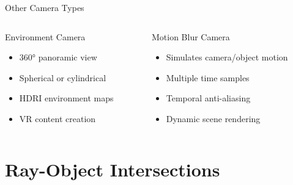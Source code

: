 \begin{frame}{Other Camera Types}
    \begin{columns}
        \begin{column}{0.5\textwidth}
            \begin{conceptbox}{Environment Camera}
                \begin{itemize}
                    \item 360° panoramic view
                    \item Spherical or cylindrical
                    \item HDRI environment maps
                    \item VR content creation
                \end{itemize}
            \end{conceptbox}
        \end{column}
        \begin{column}{0.5\textwidth}
            \begin{conceptbox}{Motion Blur Camera}
                \begin{itemize}
                    \item Simulates camera/object motion
                    \item Multiple time samples
                    \item Temporal anti-aliasing
                    \item Dynamic scene rendering
                \end{itemize}
            \end{conceptbox}
        \end{column}
    \end{columns}
\end{frame}

\section{Ray-Object Intersections}

